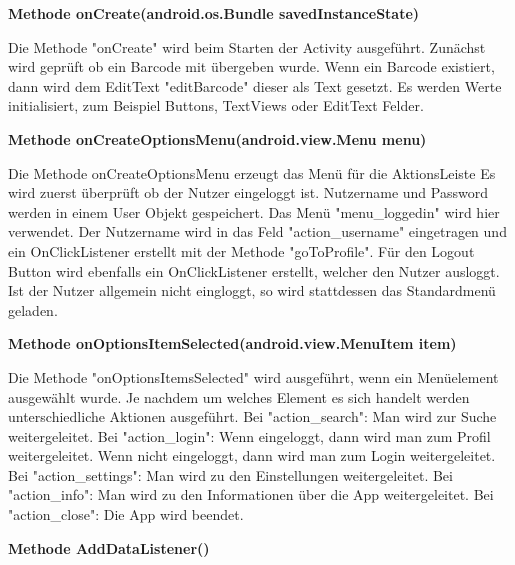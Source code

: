 \documentclass{scrartcl}
\begin{document}
\noindent\textbf{Methode onCreate(android.os.Bundle savedInstanceState)} 

\noindent Die Methode "onCreate" wird beim Starten der Activity ausgeführt. Zunächst wird geprüft ob ein Barcode mit übergeben wurde. Wenn ein Barcode existiert, dann wird dem EditText "editBarcode" dieser als Text gesetzt. Es werden Werte initialisiert, zum Beispiel Buttons, TextViews oder EditText Felder. \newline

\noindent\textbf{Methode onCreateOptionsMenu(android.view.Menu menu)} 

\noindent Die Methode onCreateOptionsMenu erzeugt das Menü für die AktionsLeiste Es wird zuerst überprüft ob der Nutzer eingeloggt ist. Nutzername und Password werden in einem User Objekt gespeichert. Das Menü "menu\_loggedin" wird hier verwendet. Der Nutzername wird in das Feld "action\_username" eingetragen und ein OnClickListener erstellt mit der Methode "goToProfile". Für den Logout Button wird ebenfalls ein OnClickListener erstellt, welcher den Nutzer ausloggt. Ist der Nutzer allgemein nicht eingloggt, so wird stattdessen das Standardmenü geladen. \newline

\noindent\textbf{Methode onOptionsItemSelected(android.view.MenuItem item)} 

\noindent Die Methode "onOptionsItemsSelected" wird ausgeführt, wenn ein Menüelement ausgewählt wurde. Je nachdem um welches Element es sich handelt werden unterschiedliche Aktionen ausgeführt. Bei "action\_search": Man wird zur Suche weitergeleitet. Bei "action\_login": Wenn eingeloggt, dann wird man zum Profil weitergeleitet. Wenn nicht eingeloggt, dann wird man zum Login weitergeleitet. Bei "action\_settings": Man wird zu den Einstellungen weitergeleitet. Bei "action\_info": Man wird zu den Informationen über die App weitergeleitet. Bei "action\_close": Die App wird beendet. \newline

\noindent\textbf{Methode AddDataListener()} 
\end{document}
